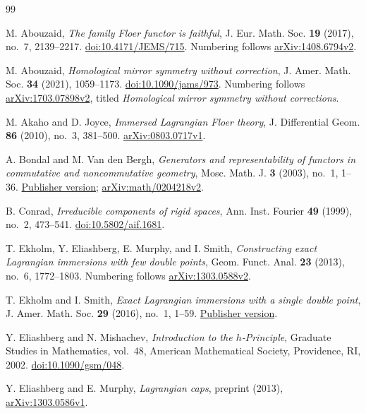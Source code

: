 \begin{thebibliography}{99}

M. Abouzaid,
\emph{The family Floer functor is faithful},
J. Eur. Math. Soc. \textbf{19} (2017), no.~7, 2139--2217.
\href{https://doi.org/10.4171/JEMS/715}{doi:10.4171/JEMS/715}.
Numbering follows \href{https://arxiv.org/abs/1408.6794v2}{arXiv:1408.6794v2}.

M. Abouzaid,
\emph{Homological mirror symmetry without correction},
J. Amer. Math. Soc. \textbf{34} (2021), 1059--1173.
\href{https://doi.org/10.1090/jams/973}{doi:10.1090/jams/973}.
Numbering follows \href{https://arxiv.org/abs/1703.07898v2}{arXiv:1703.07898v2},
titled \emph{Homological mirror symmetry without corrections}.

M. Akaho and D. Joyce,
\emph{Immersed Lagrangian Floer theory},
J. Differential Geom. \textbf{86} (2010), no.~3, 381--500.
\href{https://arxiv.org/abs/0803.0717v1}{arXiv:0803.0717v1}.

A. Bondal and M. Van den Bergh,
\emph{Generators and representability of functors in commutative and
noncommutative geometry},
Mosc. Math. J. \textbf{3} (2003), no.~1, 1--36.
\href{https://doi.org/10.17323/1609-4514-2003-3-1-1-36}{Publisher version};
\href{https://arxiv.org/abs/math/0204218v2}{arXiv:math/0204218v2}.

B. Conrad,
\emph{Irreducible components of rigid spaces},
Ann. Inst. Fourier \textbf{49} (1999), no.~2, 473--541.
\href{https://doi.org/10.5802/aif.1681}{doi:10.5802/aif.1681}.

T. Ekholm, Y. Eliashberg, E. Murphy, and I. Smith,
\emph{Constructing exact Lagrangian immersions with few double points},
Geom. Funct. Anal. \textbf{23} (2013), no.~6, 1772--1803.
Numbering follows \href{https://arxiv.org/abs/1303.0588v2}{arXiv:1303.0588v2}.

T. Ekholm and I. Smith,
\emph{Exact Lagrangian immersions with a single double point},
J. Amer. Math. Soc. \textbf{29} (2016), no.~1, 1--59.
\href{https://doi.org/10.1090/S0894-0347-2015-00825-6}{Publisher version}.

Y. Eliashberg and N. Mishachev,
\emph{Introduction to the $h$-Principle},
Graduate Studies in Mathematics, vol.~48,
American Mathematical Society, Providence, RI, 2002.
\href{https://doi.org/10.1090/gsm/048}{doi:10.1090/gsm/048}.

Y. Eliashberg and E. Murphy,
\emph{Lagrangian caps},
preprint (2013), \href{https://arxiv.org/abs/1303.0586v1}{arXiv:1303.0586v1}.


\end{thebibliography}
